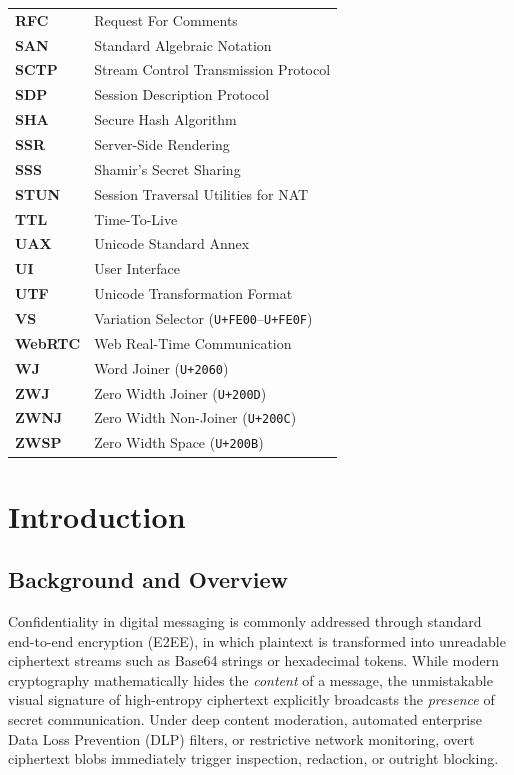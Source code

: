 \documentclass[12pt,a4paper,oneside,openany]{report}
\begin{document}
\begin{singlespace}
\begin{tabular}{@{}p{2.8cm}p{11.8cm}@{}}
\textbf{RFC}    & Request For Comments \\
\textbf{SAN}    & Standard Algebraic Notation \\
\textbf{SCTP}   & Stream Control Transmission Protocol \\
\textbf{SDP}    & Session Description Protocol \\
\textbf{SHA}    & Secure Hash Algorithm \\
\textbf{SSR}    & Server-Side Rendering \\
\textbf{SSS}    & Shamir's Secret Sharing \\
\textbf{STUN}   & Session Traversal Utilities for NAT \\
\textbf{TTL}    & Time-To-Live \\
\textbf{UAX}    & Unicode Standard Annex \\
\textbf{UI}     & User Interface \\
\textbf{UTF}    & Unicode Transformation Format \\
\textbf{VS}     & Variation Selector (\texttt{U+FE00}--\texttt{U+FE0F}) \\
\textbf{WebRTC} & Web Real-Time Communication \\
\textbf{WJ}     & Word Joiner (\texttt{U+2060}) \\
\textbf{ZWJ}    & Zero Width Joiner (\texttt{U+200D}) \\
\textbf{ZWNJ}   & Zero Width Non-Joiner (\texttt{U+200C}) \\
\textbf{ZWSP}   & Zero Width Space (\texttt{U+200B}) \\
\bottomrule
\end{tabular}
\end{singlespace}

\clearpage

\chapter{Introduction}

\section{Background and Overview}
Confidentiality in digital messaging is commonly addressed through standard end-to-end encryption (E2EE), in which plaintext is transformed into unreadable ciphertext streams such as Base64 strings or hexadecimal tokens. While modern cryptography mathematically hides the \textit{content} of a message, the unmistakable visual signature of high-entropy ciphertext explicitly broadcasts the \textit{presence} of secret communication. Under deep content moderation, automated enterprise Data Loss Prevention (DLP) filters, or restrictive network monitoring, overt ciphertext blobs immediately trigger inspection, redaction, or outright blocking.
\end{document}
